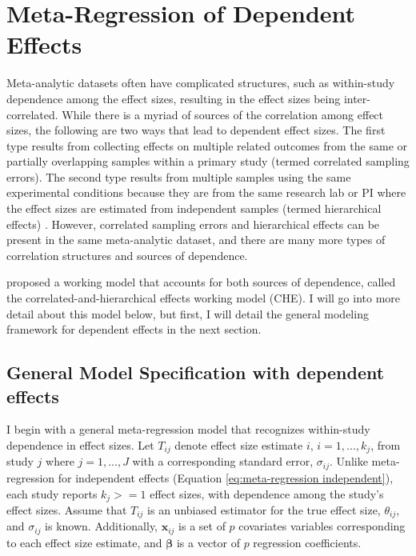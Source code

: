 \section{Meta-Regression of Dependent Effects}

Meta-analytic datasets often have complicated structures, such as within-study dependence among the effect sizes, resulting in the effect sizes being inter-correlated. While there is a myriad of sources of the correlation among effect sizes, the following are two ways that lead to dependent effect sizes. The first type results from collecting effects on multiple related outcomes from the same or partially overlapping samples within a primary study (termed correlated sampling errors). The second type results from multiple samples using the same experimental conditions because they are from the same research lab or PI where the effect sizes are estimated from independent samples (termed hierarchical effects) \autocite{hedges2010}. However, correlated sampling errors and hierarchical effects can be present in the same meta-analytic dataset, and there are many more types of correlation structures and sources of dependence.  

\textcite{pustejovsky2022} proposed a working model that accounts for both sources of dependence, called the correlated-and-hierarchical effects working model (CHE). I will go into more detail about this model below, but first, I will detail the general modeling framework for dependent effects in the next section. 


\subsection{General Model Specification with dependent effects}


I begin with a general meta-regression model that recognizes within-study dependence in effect sizes. Let $T_{ij}$ denote effect size estimate $i$, $i = 1, ..., k_j$,  from study $j$ where $j=1,..., J$ with a corresponding standard error, $\sigma_{ij}$. Unlike meta-regression for independent effects (Equation \ref{eq:meta-regression independent}), each study reports $k_j >= 1$ effect sizes, with dependence among the study's effect sizes. Assume that $T_{ij}$ is an unbiased estimator for the true effect size, $\theta_{ij}$, and $\sigma_{ij}$ is known. Additionally, $\mathbf{x}_{ij}$ is a set of $p$ covariates variables corresponding to each effect size estimate, and $\boldsymbol{\beta}$ is a vector of $p$ regression coefficients. 


